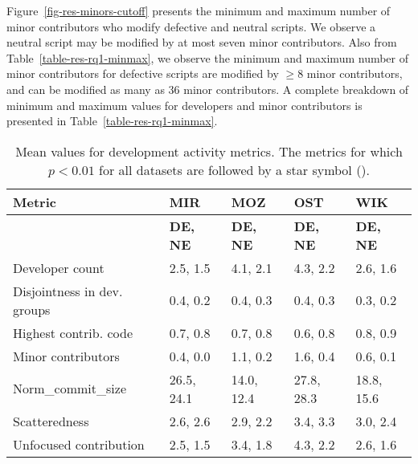 \documentclass[smallextended]{svjour3}       %
\newcommand{\starsymbol}{\ding{74}}%
\begin{document}
Figure~\ref{fig-res-minors-cutoff} presents the minimum and maximum number of minor contributors who modify defective and neutral scripts. We observe a neutral script may be modified by at most seven minor contributors. Also from Table~\ref{table-res-rq1-minmax}, we observe the minimum and maximum number of minor contributors for defective scripts are modified by $\ge 8$ minor contributors, and can be modified as many as 36 minor contributors. A complete breakdown of minimum and maximum values for developers and minor contributors is presented in Table~\ref{table-res-rq1-minmax}.  


\begin{table*}[]
\captionsetup{justification=centering}
\caption{Mean values for development activity metrics. The metrics for which $p < 0.01$ for all datasets are followed by a star symbol (\starsymbol).}
\label{table-res-rq1}  
{\footnotesize
\begin{tabular}{p{4.25cm} p{1.5cm}  p{1.3cm} p{1.3cm} p{1.3cm}  }
\hline
\textbf{Metric} & \textbf{MIR} & \textbf{MOZ} & \textbf{OST} & \textbf{WIK}\\
\hline 
 &  \textbf{DE, NE}  & \textbf{DE, NE}  & \textbf{DE, NE}  & \textbf{DE, NE}  \\
\hline
Developer count \starsymbol     & \cellcolor{lightgray} 2.5, 1.5  & \cellcolor{lightgray}4.1, 2.1  & \cellcolor{lightgray} 4.3, 2.2  & \cellcolor{lightgray} 2.6, 1.6  \\
\hline 
Disjointness in dev. groups \starsymbol & \cellcolor{lightgray} 0.4, 0.2   & \cellcolor{lightgray} 0.4, 0.3  & \cellcolor{lightgray} 0.4, 0.3  & \cellcolor{lightgray} 0.3, 0.2  \\
\hline 
Highest contrib. code \starsymbol        & \cellcolor{lightgray} 0.7, 0.8  & \cellcolor{lightgray}0.7, 0.8  & \cellcolor{lightgray} 0.6, 0.8  & \cellcolor{lightgray} 0.8, 0.9  \\
\hline 
Minor contributors \starsymbol   & \cellcolor{lightgray} 0.4, 0.0   & \cellcolor{lightgray}1.1, 0.2  & \cellcolor{lightgray} 1.6, 0.4  & \cellcolor{lightgray} 0.6, 0.1  \\
\hline 
Norm\_commit\_size  &  26.5, 24.1  & 14.0, 12.4  & 27.8, 28.3 & \cellcolor{lightgray} 18.8, 15.6  \\
\hline 
Scatteredness       & 2.6, 2.6   & \cellcolor{lightgray} 2.9, 2.2  & \cellcolor{lightgray} 3.4, 3.3  & \cellcolor{lightgray} 3.0, 2.4  \\
\hline 
Unfocused contribution \starsymbol & \cellcolor{lightgray} 2.5, 1.5   & \cellcolor{lightgray} 3.4, 1.8  & \cellcolor{lightgray} 4.3, 2.2  & \cellcolor{lightgray} 2.6, 1.6  \\
\hline 
\end{tabular}
}
\end{table*}  
\end{document}
